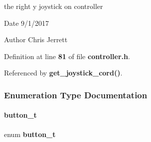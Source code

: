 the right y joystick on controller 

\begin{DoxyDate}{Date}
9/1/2017 
\end{DoxyDate}
\begin{DoxyAuthor}{Author}
Chris Jerrett 
\end{DoxyAuthor}


Definition at line \textbf{ 81} of file \textbf{ controller.\+h}.



Referenced by \textbf{ get\+\_\+joystick\+\_\+cord()}.



\subsubsection{Enumeration Type Documentation}
\mbox{\label{controller_8h_a7754652ebe470fb6cc5d30b4cd258660}} 
\paragraph{button\+\_\+t}
{\footnotesize\ttfamily enum \textbf{ button\+\_\+t}}

